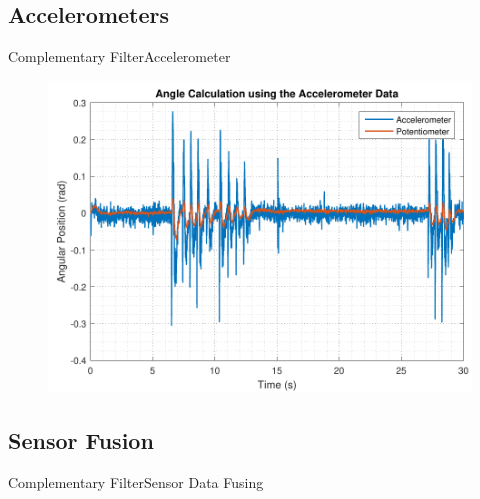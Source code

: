 \subsection{Accelerometers}
\begin{frame}{Complementary Filter}{Accelerometer}
\begin{figure}
	\centering
	\includegraphics[scale=0.6]{Pictures/angleAcc.pdf}
\end{figure}
%
\end{frame}
\subsection{Sensor Fusion}
\begin{frame}{Complementary Filter}{Sensor Data Fusing}
%
\begin{figure}
	\centering
	
\end{figure}
\end{frame}

